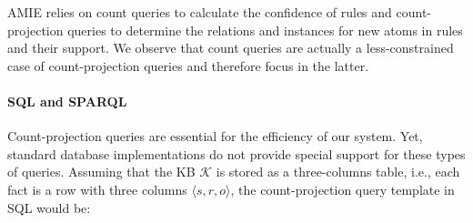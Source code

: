 {AMIE relies on count queries to calculate the confidence of rules and count-projection queries to determine
the relations and instances for new atoms in rules and their support. We observe that count queries
are actually a less-constrained case of count-projection queries and therefore focus in the latter.

\paragraph{SQL and SPARQL} Count-projection queries are essential for the efficiency of our system. 
Yet, standard database implementations do not provide special support for these types of queries. 
Assuming that the KB $\mathcal{K}$ is stored as a three-columns table, i.e., each fact is a row with three columns 
$\langle s, r, o \rangle$, the count-projection query template in SQL would be: \\ \\

}
